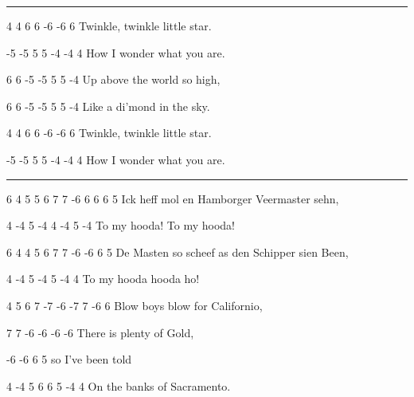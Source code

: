 \documentclass[a4paper,12pt]{article}
\begin{document}
\pagestyle{empty}
\renewcommand*\contentsname{My Harp Book \hfill \normalfont \today}
\tableofcontents
{}
\newpage
\pagestyle{fancy}
\setcounter{page}{1}

\begin{comment}

\end{comment}


\noindent\rule{\columnwidth}{1pt}
\begin{lstsong}
4   4    6   6  -6 -6   6
Twinkle, twinkle little star.

-5 -5  5  5  -4   -4   4
How I wonder what you are.

6  6 -5  -5    5    5 -4
Up above the world so high,

 6   6 -5  -5  5  5   -4
Like a di'mond in the sky.

 4   4    6  6   -6 -6    6
Twinkle, twinkle little star.

-5 -5  5 5   -4    -4  4      
How I wonder what you are.
\end{lstsong}
\newpage


\noindent\rule{\columnwidth}{1pt}
\begin{lstsong}
6 4 5 5 6 7 7 -6 6 6 6 5
Ick heff mol en Hamborger Veermaster sehn,

4 -4 5 -4 4 -4 5 -4
To my hooda! To my hooda!

6 4 4 5 6 7 7 -6 -6 6 5
De Masten so scheef as den Schipper sien Been,

4 -4 5 -4 5 -4 4
 To my hooda hooda ho!

4 5 6 7 -7 -6 -7 7 -6 6
Blow boys blow for Californio,

7 7 -6 -6 -6 -6
There is plenty of Gold,

-6 -6 6 5
so I've been told

4 -4 5 6 6 5 -4 4
On the banks of Sacramento.
\end{lstsong}
\newpage
\end{document}
